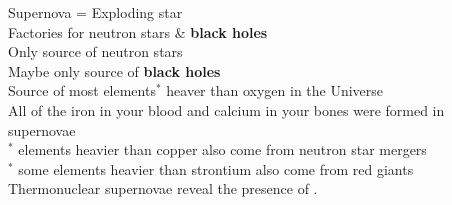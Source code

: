 Supernova = Exploding star\hfill\\[14pt]
Factories for {\color{gray}neutron stars} \& {\color{black}\bf black holes}\\
{\scriptsize Only source of {\color{gray}neutron stars}}\\
{\scriptsize Maybe only source of {\color{black}\bf black holes}}\\[14pt]
Source of most elements${}^*$ heaver than oxygen in the Universe\\
{\scriptsize All of the {\color{red}iron} in your blood and {\color{yellow}calcium} in your bones were formed in supernovae}\\
{\scriptsize ${}^*$ elements heavier than {\color{green}copper} also come from {\color{gray}neutron star} mergers}\\
{\scriptsize ${}^*$ some elements heavier than {\color{magenta}strontium} also come from red giants}\\[14pt]
Thermonuclear supernovae reveal the presence of \color{magenta}{dark energy}.\\

